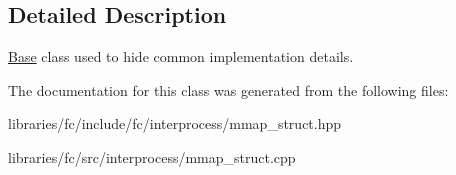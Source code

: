 \subsection{Detailed Description}
\mbox{\hyperlink{struct_base}{Base}} class used to hide common implementation details. 

The documentation for this class was generated from the following files\+:\begin{DoxyCompactItemize}
\item 
libraries/fc/include/fc/interprocess/mmap\+\_\+struct.\+hpp\item 
libraries/fc/src/interprocess/mmap\+\_\+struct.\+cpp\end{DoxyCompactItemize}
